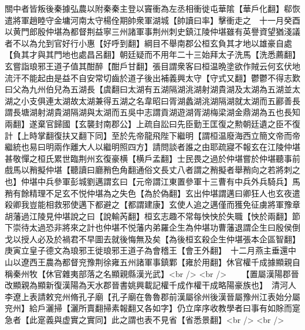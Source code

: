 關中者皆叛後秦據弘農以附秦秦主登以竇衝為左丞相衝徙屯華隂【華戶化翻】郗恢遣將軍趙睦守金墉河南太守楊佺期帥衆軍湖城【帥讀曰率】擊衝走之　十一月癸酉以黄門郎殷仲堪為都督荆益寧三州諸軍事荆州刺史鎮江陵仲堪雖有英譽資望猶淺議者不以為允到官好行小惠【好呼到翻】綱目不舉南郡公桓玄負其才地以雄豪自處【負其才與其門地也處昌呂翻】朝廷疑而不用年二十三始拜太子洗馬【洗悉薦翻】玄嘗詣琅邪王道子值其酣醉【酣戶甘翻】張目謂衆客曰桓温晩塗欲作賊云何玄伏地流汗不能起由是益不自安常切齒於道子後出補義興太守【守式又翻】鬱鬱不得志歎曰父為九州伯兒為五湖長【虞翻曰太湖有五湖隔湖洮湖射湖貴湖及太湖為五湖並太湖之小支俱連太湖故太湖兼得五湖之名韋昭曰胥湖蠡湖洮湖隔湖就太湖而五酈善長謂長塘湖射湖貴湖隔湖與太湖而五吳中志謂貢湖遊湖胥湖梅梁湖金鼎湖為五也長知兩翻】遂棄官歸國【玄襲封南郡公】上疏自訟曰先臣勤王匡復之勲朝廷遺之臣不復計【上時掌翻復扶又翻下同】至於先帝龍飛陛下繼明【謂桓温廢海西立簡文帝而帝繼統也易曰明兩作離大人以繼明照四方】請問談者誰之由耶疏寢不報玄在江陵仲堪甚敬憚之桓氏累世臨荆州玄復豪横【横戶孟翻】士民畏之過於仲堪嘗於仲堪聽事前戲馬以矟擬仲堪【聽讀曰廳矟色角翻通俗文長丈八者謂之矟擬者舉矟向之若將刺之也】仲堪中兵參軍彭城劉邁謂玄曰【元帝謂江東置參軍十三曹有中兵外兵騎兵】馬矟有餘精理不足玄不悦仲堪為之失色【為於偽翻】玄出仲堪謂邁曰卿狂人也玄夜遣殺卿我豈能相救邪使邁下都避之【都謂建康】玄使人追之邁僅而獲免征虜將軍豫章胡藩過江陵見仲堪說之曰【說輸芮翻】桓玄志趣不常每怏怏於失職【怏於兩翻】節下崇待太過恐非將來之計也仲堪不悦藩内弟羅企生為仲堪功曹藩退謂企生曰殷侯倒戈以授人必及於禍君不早圖去就後悔無及矣【為後桓玄殺企生仲堪張本企區智翻】　庚寅立皇子德文為琅邪王徙琅邪王道子為會稽王【會王外翻】　十二月燕主垂還中山以遼西王農為都督兖豫荆徐雍五州諸軍事鎮鄴【雍於用翻】休官權千成據顯親自稱秦州牧【休官雜夷部落之名顯親縣漢光武】<br />
<br />
　　【置屬漢陽郡晉改顯親為顯新復漢陽為天水郡晉書姚興載記權千成作權干成略陽豪族也】　清河人李遼上表請敕兖州脩孔子廟【孔子廟在魯魯郡前漢屬徐州後漢晉屬豫州江表始分屬兖州】給戶灑掃【灑所賣翻掃素報翻又各如字】仍立庠序收教學者曰事有如賖而寔急者【此寔義與虚實之實同】此之謂也表不見省【省悉景翻】<br />
<br />
